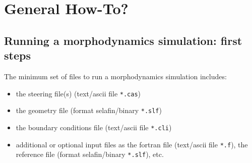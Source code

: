 \chapter[General How-To?]{General How-To?}
\pagebreak
\section{Running a morphodynamics simulation: first steps}
The minimum set of files to run a morphodynamics simulation includes:
\begin{itemize}
\item the steering file(s) (text/ascii file \texttt{*.cas})
\item the geometry file (format selafin/binary \texttt{*.slf})
\item the boundary conditions file (text/ascii file \texttt{*.cli})
\item additional or optional input files as the fortran file (text/ascii file \texttt{*.f}), the reference file (format selafin/binary \texttt{*.slf}), etc.
\end{itemize}

